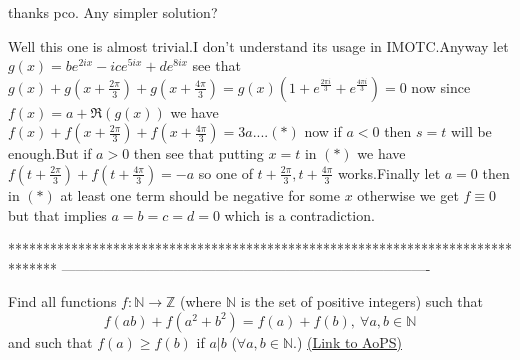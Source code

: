 \begin{mysolution}
	thanks pco.
Any simpler solution?
\end{mysolution}



\begin{mysolution}
	Well this one is almost trivial.I don't understand its usage in IMOTC.Anyway let $g(x)=be^{2ix}-ice^{5ix}+de^{8ix}$ see that $g(x)+g\left(x+\frac{2\pi}{3}\right)+g\left(x+\frac{4\pi}{3}\right)=g(x)\left(1+e^{\frac{2\pi i}{3}}+e^{\frac{4\pi i}{3}}\right)=0$ now since $f(x)=a+\Re(g(x))$ we have $f(x)+f\left(x+\frac{2\pi}{3}\right)+f\left(x+\frac{4\pi}{3}\right)=3a....(*)$ now if $a<0$ then $s=t$ will be enough.But if $a>0$ then see that putting $x=t$ in $(*)$ we have $f\left(t+\frac{2\pi}{3}\right)+f\left(t+\frac{4\pi}{3}\right)=-a$ so one of $t+\frac{2\pi}{3},t+\frac{4\pi}{3}$ works.Finally let $a=0$ then in $(*)$ at least one term should be negative for some $x$ otherwise we get $f\equiv 0$ but that implies $a=b=c=d=0$ which is a contradiction.
\end{mysolution}
*******************************************************************************
-------------------------------------------------------------------------------

\begin{problem}
	Find all functions $f: \mathbb{N} \rightarrow \mathbb{Z}$ (where $\mathbb{N}$ is the set of positive integers) such that \[f(ab) + f\left(a^2 + b^2\right) = f(a) + f(b),\ \forall a, b \in \mathbb{N}\] and such that $f(a) \geq f(b)$ if $a | b$ ($\forall a, b \in \mathbb{N}$.)
	\flushright \href{https://artofproblemsolving.com/community/c6h53451}{(Link to AoPS)}
\end{problem}



